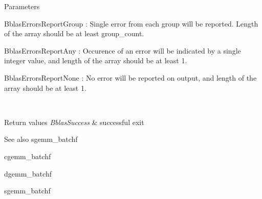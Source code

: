 \begin{DoxyParams}[1]{Parameters}
\begin{DoxyItemize}
\item Bblas\+Errors\+Report\+Group \+: Single error from each group will be reported. Length of the array should be at least group\+\_\+count.
\item Bblas\+Errors\+Report\+Any \+: Occurence of an error will be indicated by a single integer value, and length of the array should be at least 1.
\item Bblas\+Errors\+Report\+None \+: No error will be reported on output, and length of the array should be at least 1.
\end{DoxyItemize}\\
\hline
\end{DoxyParams}

\begin{DoxyRetVals}{Return values}
{\em Bblas\+Success} & successful exit\\
\hline
\end{DoxyRetVals}
\begin{DoxySeeAlso}{See also}
sgemm\+\_\+batchf 

cgemm\+\_\+batchf 

dgemm\+\_\+batchf 

sgemm\+\_\+batchf 
\end{DoxySeeAlso}
